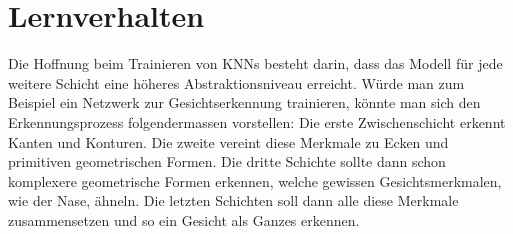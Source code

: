 \section{Lernverhalten}
Die Hoffnung beim Trainieren von KNNs besteht darin, dass das Modell für jede
weitere Schicht eine höheres Abstraktionsniveau erreicht. Würde man zum
Beispiel ein Netzwerk zur Gesichtserkennung trainieren, könnte man sich den
Erkennungsprozess folgendermassen vorstellen: Die erste Zwischenschicht erkennt
Kanten und Konturen. Die zweite vereint diese Merkmale zu Ecken und primitiven
geometrischen Formen. Die dritte Schichte sollte dann schon komplexere
geometrische Formen erkennen, welche gewissen Gesichtsmerkmalen, wie der Nase,
ähneln.
Die letzten Schichten soll dann alle diese
Merkmale zusammensetzen und so ein Gesicht als Ganzes erkennen.

